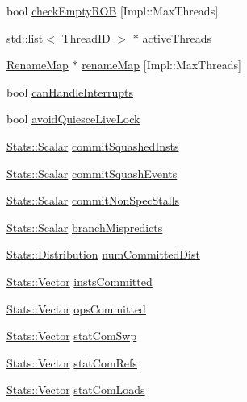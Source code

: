 \begin{DoxyCompactItemize}
\item 
bool \hyperlink{classDefaultCommit_aa2d2d9b2eec88d804e25d1cb37aa6083}{checkEmptyROB} \mbox{[}Impl::MaxThreads\mbox{]}
\item 
\hyperlink{classstd_1_1list}{std::list}$<$ \hyperlink{base_2types_8hh_ab39b1a4f9dad884694c7a74ed69e6a6b}{ThreadID} $>$ $\ast$ \hyperlink{classDefaultCommit_af6eaea53db532812052f71bf0380dab5}{activeThreads}
\item 
\hyperlink{classDefaultCommit_a341963bcea1928476182a17e357f98e3}{RenameMap} $\ast$ \hyperlink{classDefaultCommit_ac305c101c17d28451cc1f023b187b08b}{renameMap} \mbox{[}Impl::MaxThreads\mbox{]}
\item 
bool \hyperlink{classDefaultCommit_a893f45e65e8a47bca58661db7662cd9c}{canHandleInterrupts}
\item 
bool \hyperlink{classDefaultCommit_a7c6eee41dc1f18f1f485518f8b066033}{avoidQuiesceLiveLock}
\item 
\hyperlink{classStats_1_1Scalar}{Stats::Scalar} \hyperlink{classDefaultCommit_a66220ac67b22e3faf86b642ecc217546}{commitSquashedInsts}
\item 
\hyperlink{classStats_1_1Scalar}{Stats::Scalar} \hyperlink{classDefaultCommit_a89ef54d73dbded95395181561013b0b6}{commitSquashEvents}
\item 
\hyperlink{classStats_1_1Scalar}{Stats::Scalar} \hyperlink{classDefaultCommit_ab930685f4a43596f8a315d7dc9f5c2e4}{commitNonSpecStalls}
\item 
\hyperlink{classStats_1_1Scalar}{Stats::Scalar} \hyperlink{classDefaultCommit_a9cbfa1c154e785e3c45699b02a94053d}{branchMispredicts}
\item 
\hyperlink{classStats_1_1Distribution}{Stats::Distribution} \hyperlink{classDefaultCommit_ab1b6b40d7860fef5059f9bf1b843b366}{numCommittedDist}
\item 
\hyperlink{classStats_1_1Vector}{Stats::Vector} \hyperlink{classDefaultCommit_a23714085cc19270c017a67c9a508601a}{instsCommitted}
\item 
\hyperlink{classStats_1_1Vector}{Stats::Vector} \hyperlink{classDefaultCommit_a1549eb9ffd1727a5c1937e7520a0bcc8}{opsCommitted}
\item 
\hyperlink{classStats_1_1Vector}{Stats::Vector} \hyperlink{classDefaultCommit_a4cb385aa97530dd2621c74f376839e79}{statComSwp}
\item 
\hyperlink{classStats_1_1Vector}{Stats::Vector} \hyperlink{classDefaultCommit_afe174c4b8e70d840a2e91bf1ca3092ac}{statComRefs}
\item 
\hyperlink{classStats_1_1Vector}{Stats::Vector} \hyperlink{classDefaultCommit_a91927819864b9dc9d1ac706dc55d5dce}{statComLoads}

\end{DoxyCompactItemize}
